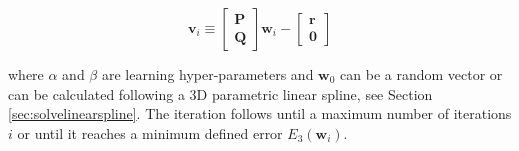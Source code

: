 \begin{equation}
\mathbf{v}_{i}
\equiv
\begin{bmatrix}
\mathbf{P}\\
\mathbf{Q}
\end{bmatrix}
\mathbf{w}_{i}
-
\begin{bmatrix}
\mathbf{r}\\
\mathbf{0}
\end{bmatrix}
\end{equation}

where $\alpha$ and $\beta$ are learning hyper-parameters and 
$\mathbf{w}_{0}$ can be a random vector or can
be calculated following a 3D parametric linear spline,
see Section \ref{sec:solvelinearspline}.
The iteration follows until a maximum number of iterations $i$ or until it reaches a
minimum defined error $E_3(\mathbf{w}_{i})$. 

